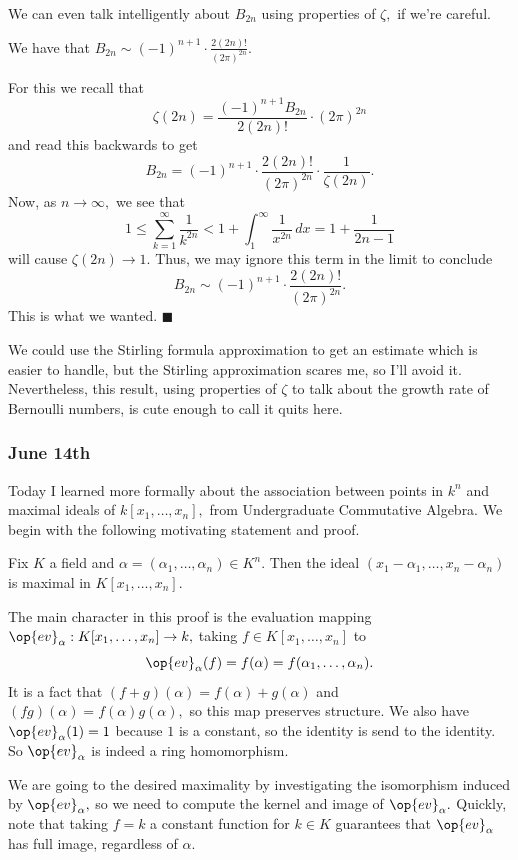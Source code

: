 We can even talk intelligently about $B_{2n}$ using properties of $\zeta,$ if we're careful.
\begin{proposition}
    We have that $B_{2n}\sim(-1)^{n+1}\cdot\frac{2(2n)!}{(2\pi)^{2n}}.$
\end{proposition}
For this we recall that
\[\zeta(2n)=\frac{(-1)^{n+1}B_{2n}}{2(2n)!}\cdot(2\pi)^{2n}\]
and read this backwards to get
\[B_{2n}=(-1)^{n+1}\cdot\frac{2(2n)!}{(2\pi)^{2n}}\cdot\frac1{\zeta(2n)}.\]
Now, as $n\to\infty,$ we see that
\[1\le\sum_{k=1}^\infty\frac1{k^{2n}}<1+\int_1^\infty\frac1{x^{2n}}\,dx=1+\frac1{2n-1}\]
will cause $\zeta(2n)\to1.$ Thus, we may ignore this term in the limit to conclude
\[B_{2n}\sim(-1)^{n+1}\cdot\frac{2(2n)!}{(2\pi)^{2n}}.\]
This is what we wanted. $\blacksquare$

We could use the Stirling formula approximation to get an estimate which is easier to handle, but the Stirling approximation scares me, so I'll avoid it. Nevertheless, this result, using properties of $\zeta$ to talk about the growth rate of Bernoulli numbers, is cute enough to call it quits here.

\subsubsection{June 14th}
Today I learned more formally about the association between points in $k^n$ and maximal ideals of $k[x_1,\ldots,x_n],$ from Undergraduate Commutative Algebra. We begin with the following motivating statement and proof.
\begin{proposition}
    Fix $K$ a field and $\alpha=(\alpha_1,\ldots,\alpha_n)\in K^n.$ Then the ideal $(x_1-\alpha_1,\ldots,x_n-\alpha_n)$ is maximal in $K[x_1,\ldots,x_n].$
\end{proposition}
The main character in this proof is the evaluation mapping $\op{ev}_\alpha:K[x_1,\ldots,x_n]\to k,$ taking $f\in K[x_1,\ldots,x_n]$ to
\[\op{ev}_\alpha(f)=f(\alpha)=f(\alpha_1,\ldots,\alpha_n).\]
It is a fact that $(f+g)(\alpha)=f(\alpha)+g(\alpha)$ and $(fg)(\alpha)=f(\alpha)g(\alpha),$ so this map preserves structure. We also have $\op{ev}_\alpha(1)=1$ because $1$ is a constant, so the identity is send to the identity. So $\op{ev}_\alpha$ is indeed a ring homomorphism.

We are going to the desired maximality by investigating the isomorphism induced by $\op{ev}_\alpha,$ so we need to compute the kernel and image of $\op{ev}_\alpha.$ Quickly, note that taking $f=k$ a constant function for $k\in K$ guarantees that $\op{ev}_\alpha$ has full image, regardless of $\alpha.$

